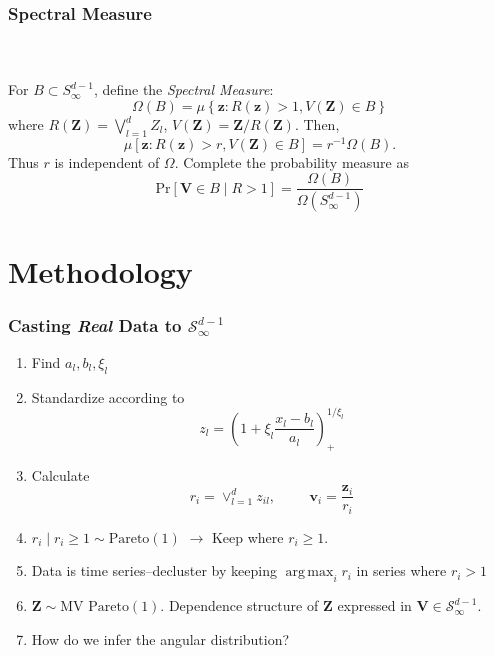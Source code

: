 \documentclass[aspectratio=169]{beamer}
\DeclareMathOperator*{\argmax}{arg\,max}
\begin{document}
\begin{frame}
  \frametitle{Spectral Measure}
  {\scriptsize\cite{ferreira2014}}\\~\vspace{0.1cm}\\
  For $B \subset S_{\infty}^{d-1}$, define the \emph{Spectral Measure}:
  \begin{equation*}
    \Omega(B) = \mu\left\lbrace\bm{z}: R(\bm {z}) > 1, V(\bm{Z}) \in B\right\rbrace
  \end{equation*}
  where $R(\bm{Z}) = \bigvee_{l = 1}^d Z_l$, $V(\bm{Z}) = \bm{Z} / R(\bm{Z})$.  Then,
  \begin{equation*}
    \mu\left[\bm{z}:R(\bm{z})>r, V(\bm{Z})\in B\right] = r^{-1}\Omega(B).
  \end{equation*}
  Thus $r$ is independent of $\Omega$.  Complete the probability measure as
  \begin{equation*}
    \text{Pr}\left[\bm{V} \in B \mid R > 1\right] = \frac{\Omega(B)}{\Omega(S_{\infty}^{d-1})}
  \end{equation*}
\end{frame}

\section{Methodology}

\begin{frame}
  \frametitle{Casting \emph{Real} Data to $\mathcal{S}_{\infty}^{d-1}$}
  \begin{enumerate}
      \item Find $a_l, b_l, \xi_l$
      \item Standardize according to
        \begin{equation*}
         z_l = \left(1 + \xi_l\frac{x_l - b_{l}}{a_{l}}\right)_{+}^{1/\xi_l}
        \end{equation*}
      \item Calculate
        \begin{equation*}
            r_i = \vee_{l=1}^d z_{il},\hspace{1cm}\bm{v}_i = \frac{\bm{z}_i}{r_i}
        \end{equation*}
        
      \item $r_i\mid r_i \geq 1 \sim \text{Pareto}(1)$ $\rightarrow$ Keep where $r_i \geq 1$.
      \item Data is time series--decluster by keeping $\argmax_i r_i$ in series where $r_i > 1$
      \item $\bm{Z} \sim \text{MV Pareto}(1)$.  Dependence structure of $\bm{Z}$ expressed in $\bm{V}\in\mathcal{S}_{\infty}^{d-1}$.
      \item How do we infer the angular distribution?
  \end{enumerate}
\end{frame}
\end{document}
